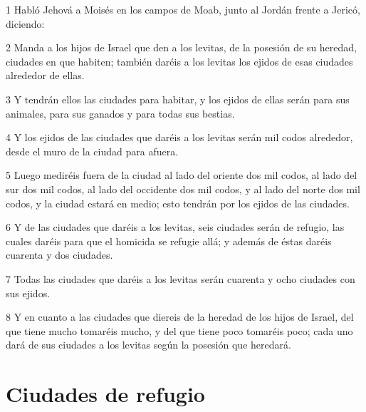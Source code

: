 \par 1 Habló Jehová a Moisés en los campos de Moab, junto al Jordán frente a Jericó, diciendo:
\par 2 Manda a los hijos de Israel que den a los levitas, de la posesión de su heredad, ciudades en que habiten; también daréis a los levitas los ejidos de esas ciudades alrededor de ellas.
\par 3 Y tendrán ellos las ciudades para habitar, y los ejidos de ellas serán para sus animales, para sus ganados y para todas sus bestias.
\par 4 Y los ejidos de las ciudades que daréis a los levitas serán mil codos   alrededor, desde el muro de la ciudad para afuera.
\par 5 Luego mediréis fuera de la ciudad al lado del oriente dos mil codos, al lado del sur dos mil codos, al lado del occidente dos mil codos, y al lado del norte dos mil codos, y la ciudad estará en medio; esto tendrán por los ejidos de las ciudades.
\par 6 Y de las ciudades que daréis a los levitas, seis ciudades serán de refugio, las cuales daréis para que el homicida se refugie allá; y además de éstas daréis cuarenta y dos ciudades.
\par 7 Todas las ciudades que daréis a los levitas serán cuarenta y ocho ciudades con sus ejidos.
\par 8 Y en cuanto a las ciudades que diereis de la heredad de los hijos de Israel, del que tiene mucho tomaréis mucho, y del que tiene poco tomaréis poco; cada uno dará de sus ciudades a los levitas según la posesión que heredará.

\section*{Ciudades de refugio}

